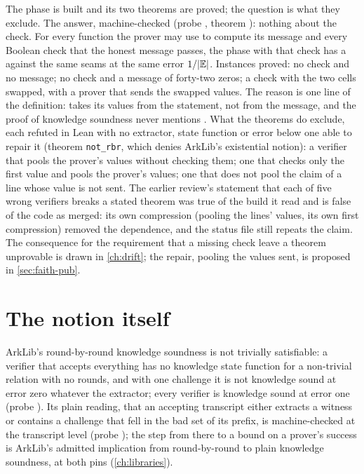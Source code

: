 The phase is built and its two theorems are proved; the question is what they exclude. The
answer, machine-checked (probe , theorem ): nothing about
the check. For every function the prover may use to compute its message and every Boolean check
that the honest message passes, the phase with that check has a  against
the same seams at the same error $1 / \lvert \mathbb{E}\rvert$. Instances proved: no check and no message; no
check and a message of forty-two zeros; a check with the two cells swapped, with a prover that
sends the swapped values. The reason is one line of the definition:  takes its
values from the statement, not from the message, and the proof of knowledge soundness never
mentions . What the theorems do exclude, each refuted in Lean with no extractor,
state function or error below one able to repair it (theorem \texttt{not\_rbr}, which denies
ArkLib's existential notion): a verifier that pools the prover's values without checking them;
one that checks only the first value and pools the prover's values; one that does not pool the
claim of a line whose value is not sent. The earlier review's statement that each of five wrong
verifiers breaks a stated theorem was true of the build it read and is false of the code as
merged: its own compression (pooling the lines' values, its own first compression) removed the
dependence, and the status file still repeats the claim. The consequence for the requirement
that a missing check leave a theorem unprovable is drawn in \cref{ch:drift}; the repair, pooling
the values sent, is proposed in \cref{sec:faith-pub}.

\section{The notion itself}\label{sec:nv-notion}

ArkLib's round-by-round knowledge soundness is not trivially satisfiable: a verifier that
accepts everything has no knowledge state function for a non-trivial relation with no rounds,
and with one challenge it is not knowledge sound at error zero whatever the extractor; every
verifier is knowledge sound at error one (probe ). Its plain reading, that an
accepting transcript either extracts a witness or contains a challenge that fell in the bad set
of its prefix, is machine-checked at the transcript level (probe ); the
step from there to a bound on a prover's success is ArkLib's admitted implication from
round-by-round to plain knowledge soundness, at both pins (\cref{ch:libraries}).

